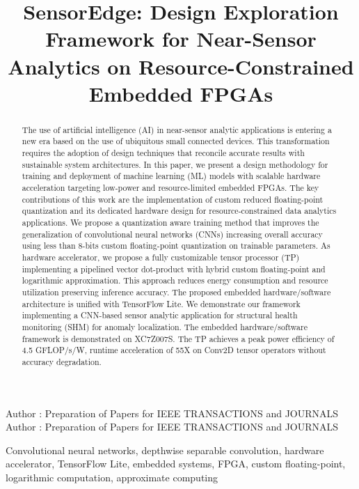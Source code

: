 \title {SensorEdge: Design Exploration Framework for Near-Sensor Analytics on Resource-Constrained Embedded FPGAs}



\markboth
{Author \headeretal: Preparation of Papers for IEEE TRANSACTIONS and JOURNALS}
{Author \headeretal: Preparation of Papers for IEEE TRANSACTIONS and JOURNALS}


\begin{abstract}
The use of artificial intelligence (AI) in near-sensor analytic applications is entering a new era based on the use of ubiquitous small connected devices. This transformation requires the adoption of design techniques that reconcile accurate results with sustainable system architectures. In this paper, we present a design methodology for training and deployment of machine learning (ML) models with scalable hardware acceleration targeting low-power and resource-limited embedded FPGAs. The key contributions of this work are the implementation of custom reduced floating-point quantization and its dedicated hardware design for resource-constrained data analytics applications. We propose a quantization aware training method that improves the generalization of convolutional neural networks (CNNs) increasing overall accuracy using less than 8-bits custom floating-point quantization on trainable parameters. As hardware accelerator, we propose a fully customizable tensor processor (TP) implementing a pipelined vector dot-product with hybrid custom floating-point and logarithmic approximation. This approach reduces energy consumption and resource utilization preserving inference accuracy. The proposed embedded hardware/software architecture is unified with TensorFlow Lite. We demonstrate our framework implementing a CNN-based sensor analytic application for structural health monitoring (SHM) for anomaly localization. The embedded hardware/software framework is demonstrated on XC7Z007S. The TP achieves a peak power efficiency of 4.5 GFLOP/s/W, runtime acceleration of 55X on Conv2D tensor operators without accuracy degradation.
\end{abstract}

\begin{keywords}
Convolutional neural networks, depthwise separable convolution, hardware accelerator, TensorFlow Lite, embedded systems, FPGA, custom floating-point, logarithmic computation, approximate computing
\end{keywords}

\titlepgskip=-15pt

\maketitle